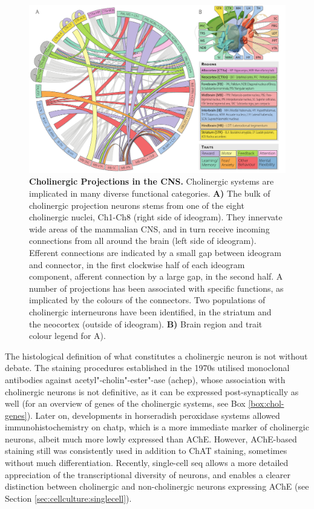 \begin{figure}
\includegraphics[width=\textwidth]{figures/projections}
\caption[Cholinergic Projections.]{\textbf{Cholinergic Projections in the CNS.} Cholinergic systems are implicated in many diverse functional categories. \textbf{A)} The bulk of cholinergic projection neurons stems from one of the eight cholinergic nuclei, Ch1-Ch8 (right side of ideogram). They innervate wide areas of the mammalian CNS, and in turn receive incoming connections from all around the brain (left side of ideogram). Efferent connections are indicated by a small gap between ideogram and connector, in the first clockwise half of each ideogram component, afferent connection by a large gap, in the second half. A number of projections has been associated with specific functions, as implicated by the colours of the connectors. Two populations of cholinergic interneurons have been identified, in the striatum and the neocortex (outside of ideogram). \textbf{B)} Brain region and trait colour legend for A).
\label{fig:projections}}
\end{figure}

The histological definition of what constitutes a cholinergic neuron is not without debate. The staining procedures established in the 1970s utilised monoclonal antibodies against acetyl"-cholin"-ester"-ase (\acs{achep}),\cite{Mesulam1976} whose association with cholinergic neurons is not definitive, as it can be expressed post-synaptically as well (for an overview of genes of the cholinergic systems, see Box \ref{box:chol-genes}). Later on, developments in horseradish peroxidase systems allowed immunohistochemistry on \ac{chatp}, which is a more immediate marker of cholinergic neurons,\cite{Mesulam1984} albeit much more lowly expressed than AChE. However, AChE-based staining still was consistently used in addition to ChAT staining,\cite{Mesulam1988} sometimes without much differentiation. Recently, single-cell \ac{seq} allows a more detailed appreciation of the transcriptional diversity of neurons, and enables a clearer distinction between cholinergic and non-cholinergic neurons expressing AChE (see Section \ref{sec:cellculture:singlecell}).

